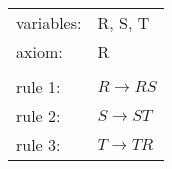 \documentclass[10pt,a4paper,boxed]{hmcpset}
\begin{document}
\begin{problem}[Assignment 24]
\end{problem}
\begin{solution}
\end{solution}

\begin{problem}[Assignment 25]
\end{problem}
\begin{solution}
\end{solution}

\begin{problem}[Assignment 26]
\end{problem}
\begin{solution}
\end{solution}

\begin{problem}[Assignment 27]
\end{problem}
\begin{solution}
\end{solution}

\begin{problem}[Assignment 28]
\end{problem}
\begin{solution}
	\begin{tabular}{ll}
	 variables: & R, S, T\\ 
	 axiom: & R \\
	 		& \\
	 rule 1: & $R \rightarrow RS$ \\
	 rule 2: & $S \rightarrow ST$ \\
	 rule 3: & $T \rightarrow TR$ \\
	\end{tabular}
\end{solution}

\begin{problem}[Assignment 29]
\end{problem}
\begin{solution}
\end{solution}

\begin{problem}[Assignment 30]
\end{problem}
\begin{solution}
\end{solution}
\end{document}
